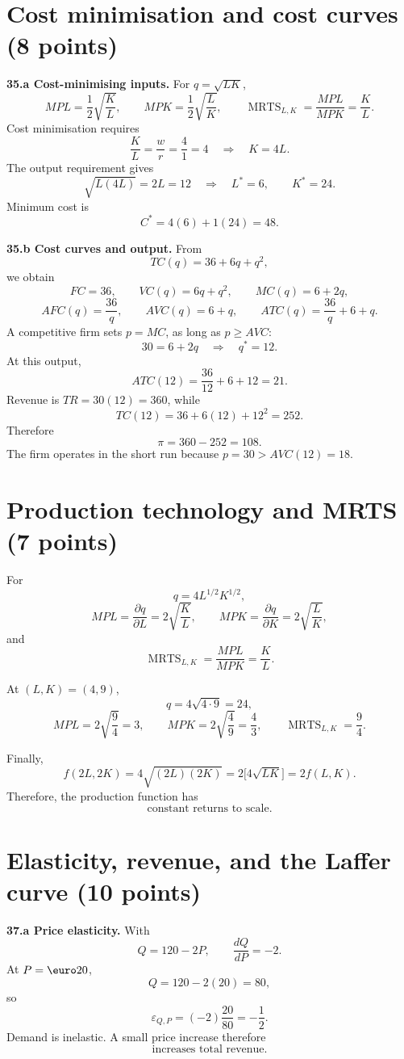 \documentclass[11pt,a4paper]{article}
\newcommand{\MRTS}{\operatorname{MRTS}}
\begin{document}
\section{Cost minimisation and cost curves \hfill (8 points)}

\textbf{35.a Cost-minimising inputs.} For \(q=\sqrt{LK}\),
\[
MPL=\frac12\sqrt{\frac{K}{L}},
\qquad
MPK=\frac12\sqrt{\frac{L}{K}},
\qquad
\MRTS_{L,K}=\frac{MPL}{MPK}=\frac{K}{L}.
\]
Cost minimisation requires
\[
\frac{K}{L}=\frac{w}{r}=\frac41=4
\quad\Longrightarrow\quad
K=4L.
\]
The output requirement gives
\[
\sqrt{L(4L)}=2L=12
\quad\Longrightarrow\quad
\boxed{L^*=6,\qquad K^*=24.}
\]
Minimum cost is
\[
\boxed{C^*=4(6)+1(24)=48.}
\]

\textbf{35.b Cost curves and output.} From
\[
TC(q)=36+6q+q^2,
\]
we obtain
\[
\boxed{FC=36,\qquad VC(q)=6q+q^2,\qquad MC(q)=6+2q,}
\]
\[
\boxed{AFC(q)=\frac{36}{q},\qquad AVC(q)=6+q,\qquad
ATC(q)=\frac{36}{q}+6+q.}
\]
A competitive firm sets \(p=MC\), as long as \(p\geq AVC\):
\[
30=6+2q
\quad\Longrightarrow\quad
\boxed{q^*=12.}
\]
At this output,
\[
ATC(12)=\frac{36}{12}+6+12=\boxed{21}.
\]
Revenue is \(TR=30(12)=360\), while
\[
TC(12)=36+6(12)+12^2=252.
\]
Therefore
\[
\boxed{\pi=360-252=108.}
\]
The firm operates in the short run because \(p=30>AVC(12)=18\).

\section{Production technology and MRTS \hfill (7 points)}

For
\[
q=4L^{1/2}K^{1/2},
\]
\[
MPL=\frac{\partial q}{\partial L}
=\boxed{2\sqrt{\frac{K}{L}}},
\qquad
MPK=\frac{\partial q}{\partial K}
=\boxed{2\sqrt{\frac{L}{K}}},
\]
and
\[
\MRTS_{L,K}=\frac{MPL}{MPK}
=\boxed{\frac{K}{L}}.
\]

At \((L,K)=(4,9)\),
\[
q=4\sqrt{4\cdot9}=\boxed{24},
\]
\[
MPL=2\sqrt{\frac94}=\boxed{3},
\qquad
MPK=2\sqrt{\frac49}=\boxed{\frac43},
\qquad
\MRTS_{L,K}=\boxed{\frac94}.
\]

Finally,
\[
f(2L,2K)=4\sqrt{(2L)(2K)}
=2\bigl[4\sqrt{LK}\bigr]
=2f(L,K).
\]
Therefore, the production function has
\[
\boxed{\text{constant returns to scale}.}
\]

\section{Elasticity, revenue, and the Laffer curve \hfill (10 points)}

\textbf{37.a Price elasticity.} With
\[
Q=120-2P,
\qquad
\frac{dQ}{dP}=-2.
\]
At \(P=\text{\euro}20\),
\[
Q=120-2(20)=80,
\]
so
\[
\varepsilon_{Q,P}
=(-2)\frac{20}{80}
=\boxed{-\frac12}.
\]
Demand is inelastic. A small price increase therefore
\[
\boxed{\text{increases total revenue}.}
\]
\end{document}
